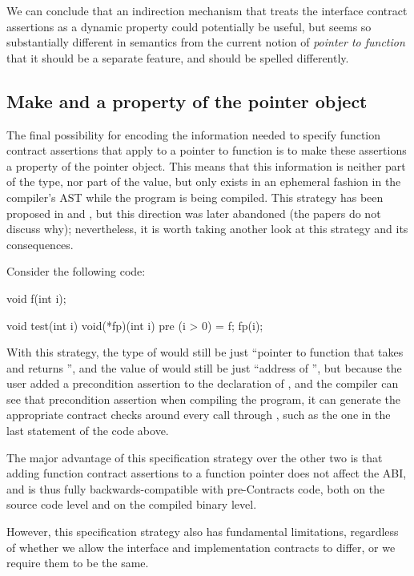 We can conclude that an indirection mechanism that treats the interface contract assertions as a dynamic property could potentially be useful, but seems so substantially different in semantics from the current notion of \emph{pointer to function} that it should be a separate feature, and should be spelled differently.

\subsection{Make  and  a property of the pointer object}
\label{subsec:makeobject}

The final possibility for encoding the information needed to specify function contract assertions that apply to a pointer to function is to make these assertions a property of the pointer object. This means that this information is neither part of the type, nor part of the value, but only exists in an ephemeral fashion in the compiler's AST while the program is being compiled. This strategy has been proposed in \cite{P0246R0} and \cite{P0247R0}, but this direction was later abandoned (the papers do not discuss why); nevertheless, it is worth taking another look at this strategy and its consequences.

Consider the following code:

\begin{codeblock}
void f(int i);

void test(int i) {
  void(*fp)(int i) pre (i > 0) = f;
  fp(i);
}
\end{codeblock}
With this strategy, the type of  would still be just ``pointer to function that takes  and returns '', and the value of  would still be just ``address of '', but because the user added a precondition assertion to the declaration of , and the compiler can see that precondition assertion when compiling the program, it can generate the appropriate contract checks around every call through , such as the one in the last statement of the code above.

The major advantage of this specification strategy over the other two is that adding function contract assertions to a function pointer does not affect the ABI, and is thus fully backwards-compatible with pre-Contracts code, both on the source code level and on the compiled binary level.

However, this specification strategy also has fundamental limitations, regardless of whether we allow the interface and implementation contracts to differ, or we require them to be the same.

